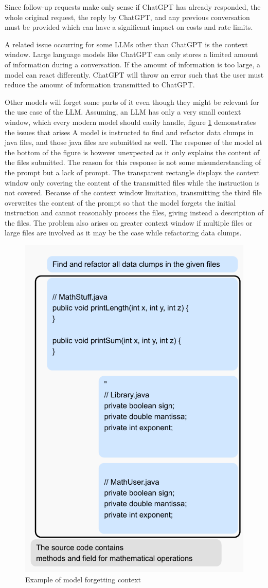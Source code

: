 Since follow-up requests make only sense if ChatGPT has already responded, the whole original request, the reply by ChatGPT, and any previous conversation must be provided which can have a significant impact on costs and rate limits. 

A related issue occurring for some \acp{LLM} other than ChatGPT is the context window. Large language models like ChatGPT can only stores a limited amount of information during a conversation. If the amount of information is too large,  a model can react differently. ChatGPT will throw an error such that the user must reduce the amount of information transmitted to ChatGPT.

Other models will forget some parts of it even though they might be relevant for the use case of the \ac{LLM}.
Assuming, an \ac{LLM} has only a very small context window, which every modern model should easily handle, figure \ref{fig:llm_loose_context} demonstrates the issues that arises  A model is instructed to find and refactor data clumps in java files, and those java files are submitted as well. The response of the model at the bottom of the figure is however unexpected as it only explains the content of the files submitted. The reason for this response is not some misunderstanding of the prompt but a lack of prompt. The transparent rectangle displays the context window only covering the content of the transmitted files while the instruction is not covered. 
Because of the context window limitation, transmitting the third file overwrites the content of the prompt so that the model forgets the initial instruction and cannot reasonably process the files, giving instead a description of the files. The problem also arises on greater context window if multiple files or large files are involved as it may be the case while refactoring data clumps.

\begin{figure}[ht!]
    \centering
    \includegraphics[width=0.6\columnwidth]{figures/chapter2/chat_dialog.pdf}
    \caption{Example of model forgetting context}
    \label{fig:llm_loose_context}
\end{figure}

